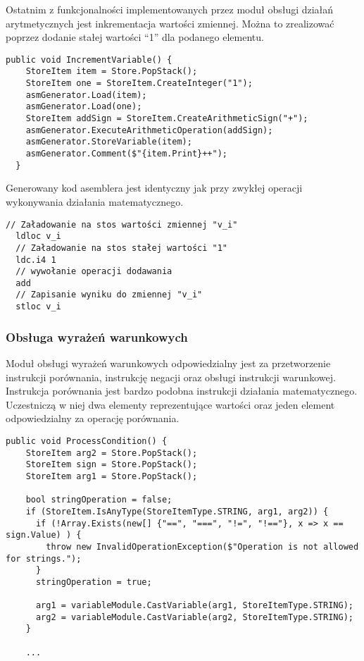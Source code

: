 \par Ostatnim z funkcjonalności implementowanych przez moduł obsługi działań arytmetycznych jest inkrementacja wartości zmiennej. Można to zrealizować poprzez dodanie stałej wartości ``1'' dla podanego elementu.

\begin{lstlisting}[language=CSharp, caption={Implementacja funkcji obsługującej inkrementację wartości}, label=alg:assign6]
  public void IncrementVariable() {
    StoreItem item = Store.PopStack();
    StoreItem one = StoreItem.CreateInteger("1");
    asmGenerator.Load(item);
    asmGenerator.Load(one);
    StoreItem addSign = StoreItem.CreateArithmeticSign("+");
    asmGenerator.ExecuteArithmeticOperation(addSign);
    asmGenerator.StoreVariable(item);
    asmGenerator.Comment($"{item.Print}++");
  }
\end{lstlisting}
Generowany kod asemblera jest identyczny jak przy zwykłej operacji wykonywania działania matematycznego.

\begin{lstlisting}[language=IL, caption=Kod assemblera przedstawiający inkrementacje wartości, label=alg:assign7]
  // Załadowanie na stos wartości zmiennej "v_i"
  ldloc v_i
  // Załadowanie na stos stałej wartości "1"
  ldc.i4 1
  // wywołanie operacji dodawania
  add
  // Zapisanie wyniku do zmiennej "v_i"
  stloc v_i
\end{lstlisting}


\subsubsection{Obsługa wyrażeń warunkowych}

Moduł obsługi wyrażeń warunkowych odpowiedzialny jest za przetworzenie instrukcji porównania, instrukcję negacji oraz obsługi instrukcji warunkowej. Instrukcja porównania jest bardzo podobna instrukcji działania matematycznego. Uczestniczą w niej dwa elementy reprezentujące wartości oraz jeden element odpowiedzialny za operację porównania.

\begin{lstlisting}[language=CSharp, caption={Implementacja funkcji obsługującej wyrażenia warunkowe cz.1}, label=alg:condition1]
  public void ProcessCondition() {
    StoreItem arg2 = Store.PopStack();
    StoreItem sign = Store.PopStack();
    StoreItem arg1 = Store.PopStack();

    bool stringOperation = false;
    if (StoreItem.IsAnyType(StoreItemType.STRING, arg1, arg2)) {
      if (!Array.Exists(new[] {"==", "===", "!=", "!=="}, x => x == sign.Value) ) {
        throw new InvalidOperationException($"Operation is not allowed for strings.");
      }
      stringOperation = true;

      arg1 = variableModule.CastVariable(arg1, StoreItemType.STRING);
      arg2 = variableModule.CastVariable(arg2, StoreItemType.STRING);
    }

    ...
\end{lstlisting}

